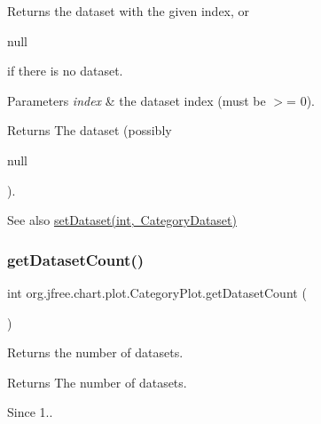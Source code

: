 Returns the dataset with the given index, or
\begin{DoxyCode}
null 
\end{DoxyCode}
 if there is no dataset.


\begin{DoxyParams}{Parameters}
{\em index} & the dataset index (must be $>$= 0).\\
\hline
\end{DoxyParams}
\begin{DoxyReturn}{Returns}
The dataset (possibly
\begin{DoxyCode}
null 
\end{DoxyCode}
 ).
\end{DoxyReturn}
\begin{DoxySeeAlso}{See also}
\mbox{\hyperlink{classorg_1_1jfree_1_1chart_1_1plot_1_1_category_plot_adae0139eeab71b8c67ae9f7e219a9175}{set\+Dataset(int, Category\+Dataset)}} 
\end{DoxySeeAlso}
\mbox{\label{classorg_1_1jfree_1_1chart_1_1plot_1_1_category_plot_a3dcfbbc2bb7c4243df4a41a4551553bd}} 
\subsubsection{\texorpdfstring{get\+Dataset\+Count()}{getDatasetCount()}}
{\footnotesize\ttfamily int org.\+jfree.\+chart.\+plot.\+Category\+Plot.\+get\+Dataset\+Count (\begin{DoxyParamCaption}{ }\end{DoxyParamCaption})}

Returns the number of datasets.

\begin{DoxyReturn}{Returns}
The number of datasets.
\end{DoxyReturn}
\begin{DoxySince}{Since}
1.. 
\end{DoxySince}
\mbox{\label{classorg_1_1jfree_1_1chart_1_1plot_1_1_category_plot_a697871f5768fb78444390dcfaa9444bd}} 
